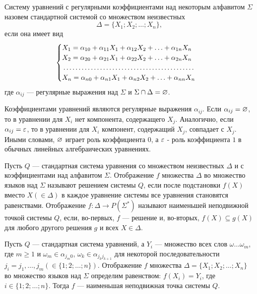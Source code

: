 Систему уравнений с регулярными коэффициентами над некоторым алфавитом $\Sigma$ назовем стандартной системой со множеством неизвестных
\[
	\Delta = \{ X_1;X_2;\ldots ;X_n \},
\]
если она имеет вид
\begin{equation}
\label{GeneralSysWRegExprK}
\begin{cases}
X_{1} = \alpha_{10} + \alpha_{11}X_1 + \alpha_{12}X_2 + \ldots  + \alpha_{1n}X_n\\
X_{2} = \alpha_{20} + \alpha_{21}X_1 + \alpha_{22}X_2 + \ldots  + \alpha_{2n}X_n\\
\dotfill\\
X_n = \alpha_{n0} + \alpha_{n1}X_1 + \alpha_{n2}X_2 + \ldots  + \alpha_{nn}X_n
\end{cases}
\end{equation}
где $\alpha_{ij}$ --- регулярные выражения над $\Sigma$ и $\Sigma\cap\Delta=\varnothing$.

Коэффициентами уравнений являются регулярные выражения $\alpha_{ij}$. Если $\alpha_{ij}=\varnothing$, то в уравнении для $X_i$ нет компонента, содержащего $X_j$. Аналогично, если $\alpha_{ij}=\varepsilon$, то в уравнении для $X_i$ компонент, содержащий $X_j$, совпадает с $X_j$. Иными словами, $\varnothing$ играет роль коэффициента $0$, а $\varepsilon$ - роль коэффициента $1$ в обычных линейных алгебраических уравнениях.

Пусть $Q$ --- стандартная система уравнения со множеством неизвестных $\Delta$ и с коэффициентами над алфавитом $\Sigma$. Отображение $f$ множества $\Delta$ во множество языков над $\Sigma$ называют решением системы $Q$, если после подстановки $f(X)$ вместо $X(\in\Delta)$ в каждое уравнение системы все уравнения становятся равенствами. Отображение $f\colon \Delta\to P(\Sigma^*)$ называют наименьшей неподвижной точкой системы $Q$, если, во-первых, $f$ --- решение и, во-вторых, $f(X)\subseteq g(X)$ для любого другого решения $g$ и всех $X\in\Delta$.

\begin{mytheorem}
\label{theorem-NNTSysReg}
Пусть $Q$ --- стандартная система уравнений, а $Y_i$ --- множество всех слов $\omega\ldots\omega_m$, где $m\ge 1$ и $\omega_m\in\alpha_{j_m0}$, $\omega_k\in\alpha_{j_kj_{k+1}}$ для некоторой последовательности $j_i=j_1, \ldots , j_m (\in\{1;2;\dots ;n\})$. Отображение $f$ множества $\Delta=\{X_1;X_2;\ldots ;X_n\}$ во множество языков над $\Sigma$ определим равенством: $f(X_i)=Y_i$, где $i\in\{1;2;\ldots ;n\}$. Тогда $f$ --- наименьшая неподвижная точка системы $Q$.
\end{mytheorem}

